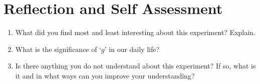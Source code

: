 \section{Reflection and Self Assessment}
\begin{enumerate}
\item What did you find most and least interesting about this experiment? Explain.
\item What is the significance of ‘$g$’ in our daily life?
\item Is there anything you do not understand about this experiment? If so, what is it and in what ways can you improve your understanding?
\end{enumerate}